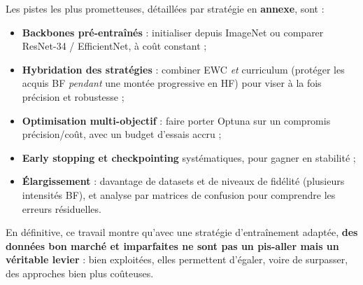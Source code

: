 \documentclass[11pt,a4paper,openany]{book}
\begin{document}
Les pistes les plus prometteuses, détaillées par stratégie en \textbf{annexe}, sont :

\begin{itemize}
  \item \textbf{Backbones pré-entraînés} : initialiser depuis ImageNet ou comparer ResNet-34 / EfficientNet, à coût constant ;
  \item \textbf{Hybridation des stratégies} : combiner EWC \emph{et} curriculum (protéger les acquis BF \emph{pendant} une montée progressive en HF) pour viser à la fois précision et robustesse ;
  \item \textbf{Optimisation multi-objectif} : faire porter Optuna sur un compromis précision/coût, avec un budget d'essais accru ;
  \item \textbf{Early stopping et checkpointing} systématiques, pour gagner en stabilité ;
  \item \textbf{Élargissement} : davantage de datasets et de niveaux de fidélité (plusieurs intensités BF), et analyse par matrices de confusion pour comprendre les erreurs résiduelles.
\end{itemize}

En définitive, ce travail montre qu'avec une stratégie d'entraînement adaptée, \textbf{des données bon marché et imparfaites ne sont pas un pis-aller mais un véritable levier} : bien exploitées, elles permettent d'égaler, voire de surpasser, des approches bien plus coûteuses.


\newpage
\end{document}
